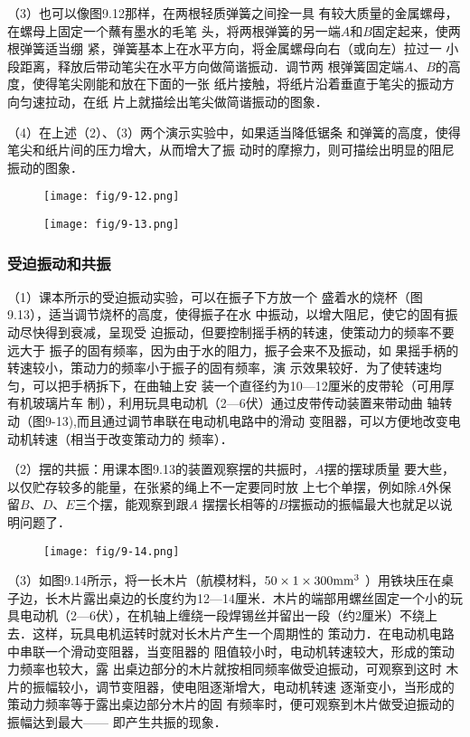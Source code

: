 （3）也可以像图9.12那样，在两根轻质弹簧之间拴一具
有较大质量的金属螺母，在螺母上固定一个蘸有墨水的毛笔
头，将两根弹簧的另一端$A$和$B$固定起来，使两根弹簧适当绷
紧，弹簧基本上在水平方向，将金属螺母向右（或向左）拉过一
小段距离，释放后带动笔尖在水平方向做简谐振动．调节两
根弹簧固定端$A$、$B$的高度，使得笔尖刚能和放在下面的一张
纸片接触，将纸片沿着垂直于笔尖的振动方向匀速拉动，在纸
片上就描绘出笔尖做简谐振动的图象．

（4）在上述（2）、（3）两个演示实验中，如果适当降低锯条
和弹簧的高度，使得笔尖和纸片间的压力增大，从而增大了振
动时的摩擦力，则可描绘出明显的阻尼振动的图象．
\begin{figure}[htp]\centering
    \begin{minipage}[t]{0.48\textwidth}
    \centering
\texttt{[image: fig/9-12.png]}
    \caption{}
    \end{minipage}
    \begin{minipage}[t]{0.48\textwidth}
    \centering
\texttt{[image: fig/9-13.png]}
    \caption{}
    \end{minipage}
    \end{figure}

\subsubsection{受迫振动和共振}
（1）课本所示的受迫振动实验，可以在振子下方放一个
盛着水的烧杯（图9.13），适当调节烧杯的高度，使得振子在水
中振动，以增大阻尼，使它的固有振动尽快得到衰减，呈现受
迫振动，但要控制摇手柄的转速，使策动力的频率不要远大于
振子的固有频率，因为由于水的阻力，振子会来不及振动，如
果摇手柄的转速较小，策动力的频率小于振子的固有频率，演
示效果较好．为了使转速均匀，可以把手柄拆下，在曲轴上安
装一个直径约为10—12厘米的皮带轮（可用厚有机玻璃片车
制），利用玩具电动机（2—6伏）通过皮带传动装置来带动曲
轴转动（图9-13),而且通过调节串联在电动机电路中的滑动
变阻器，可以方便地改变电动机转速（相当于改变策动力的
频率）．

（2）摆的共振：用课本图9.13的装置观察摆的共振时，$A$摆的摆球质量
要大些，以仅贮存较多的能量，在张紧的绳上不一定要同时放
上七个单摆，例如除$A$外保留$B$、$D$、$E$三个摆，能观察到跟$A$
摆摆长相等的$B$摆振动的振幅最大也就足以说明问题了．

\begin{figure}[htp]
    \centering
    \texttt{[image: fig/9-14.png]}
    \caption{}
\end{figure}

（3）如图9.14所示，将一长木片（航模材料，$50\times1\times300{\rm mm^3}$
）用铁块压在桌子边，长木片露出桌边的长度约为12—14厘米．木片的端部用螺丝固定一个小的玩具电动机（2—6伏），在机轴上缠绕一段焊锡丝并留出一段（约2厘米）不绕上
去．这样，玩具电机运转时就对长木片产生一个周期性的
策动力．在电动机电路中串联一个滑动变阻器，当变阻器的
阻值较小时，电动机转速较大，形成的策动力频率也较大，露
出桌边部分的木片就按相同频率做受迫振动，可观察到这时
木片的振幅较小，调节变阻器，使电阻逐渐增大，电动机转速
逐渐变小，当形成的策动力频率等于露出桌边部分木片的固
有频率时，便可观察到木片做受迫振动的振幅达到最大——
即产生共振的现象．

